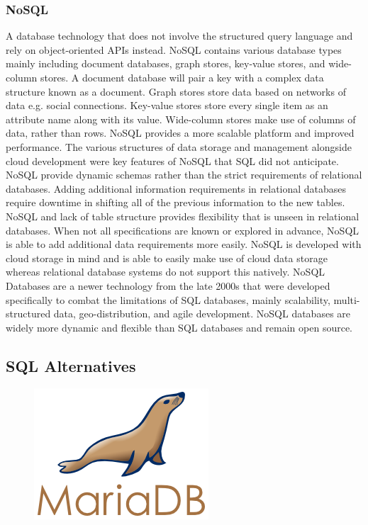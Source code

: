 \documentclass[12pt]{report}
\begin{document}
\subsubsection*{NoSQL}

A database technology that does not involve the structured query language and rely on object-oriented APIs instead.  NoSQL contains various database types mainly including document databases, graph stores, key-value stores, and wide-column stores.  A document database will pair a key with a complex data structure known as a document.  Graph stores store data based on networks of data e.g. social connections.  Key-value stores store every single item as an attribute name along with its value.  Wide-column stores make use of columns of data, rather than rows.  NoSQL provides a more scalable platform and improved performance.  The various structures of data storage and management alongside cloud development were key features of NoSQL that SQL did not anticipate.  
NoSQL provide dynamic schemas rather than the strict requirements of relational databases.  Adding additional information requirements in relational databases require downtime in shifting all of the previous information to the new tables.  NoSQL and lack of table structure provides flexibility that is unseen in relational databases.  When not all specifications are known or explored in advance, NoSQL is able to add additional data requirements more easily.  NoSQL is developed with cloud storage in mind and is able to easily make use of cloud data storage whereas relational database systems do not support this natively.  
NoSQL Databases are a newer technology from the late 2000s that were developed specifically to combat the limitations of SQL databases, mainly scalability, multi-structured data, geo-distribution, and agile development.  NoSQL databases are widely more dynamic and flexible than SQL databases and remain open source.

\subsection*{SQL Alternatives}

\begin{figure}[h]
	\centering
	\includegraphics[width=0.251\linewidth]{mariadb}
\end{figure}
\end{document}
